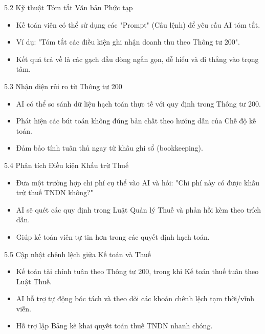 \documentclass[aspectratio=169]{beamer}
\begin{document}
\begin{frame}{5.2 Kỹ thuật Tóm tắt Văn bản Phức tạp}
    \begin{itemize}
        \item Kế toán viên có thể sử dụng các "Prompt" (Câu lệnh) để yêu cầu AI tóm tắt.
        \item Ví dụ: "Tóm tắt các điều kiện ghi nhận doanh thu theo Thông tư 200".
        \item Kết quả trả về là các gạch đầu dòng ngắn gọn, dễ hiểu và đi thẳng vào trọng tâm.
    \end{itemize}
\end{frame}


\begin{frame}{5.3 Nhận diện rủi ro từ Thông tư 200}
    \begin{itemize}
        \item AI có thể so sánh dữ liệu hạch toán thực tế với quy định trong Thông tư 200.
        \item Phát hiện các bút toán không đúng bản chất theo hướng dẫn của Chế độ kế toán.
        \item Đảm bảo tính tuân thủ ngay từ khâu ghi sổ (bookkeeping).
    \end{itemize}
\end{frame}


\begin{frame}{5.4 Phân tích Điều kiện Khấu trừ Thuế}
    \begin{itemize}
        \item Đưa một trường hợp chi phí cụ thể vào AI và hỏi: "Chi phí này có được khấu trừ thuế TNDN không?"
        \item AI sẽ quét các quy định trong Luật Quản lý Thuế và phản hồi kèm theo trích dẫn.
        \item Giúp kế toán viên tự tin hơn trong các quyết định hạch toán.
    \end{itemize}
\end{frame}


\begin{frame}{5.5 Cập nhật chênh lệch giữa Kế toán và Thuế}
    \begin{itemize}
        \item Kế toán tài chính tuân theo Thông tư 200, trong khi Kế toán thuế tuân theo Luật Thuế.
        \item AI hỗ trợ tự động bóc tách và theo dõi các khoản chênh lệch tạm thời/vĩnh viễn.
        \item Hỗ trợ lập Bảng kê khai quyết toán thuế TNDN nhanh chóng.
    \end{itemize}
\end{frame}
\end{document}
